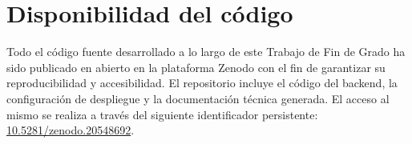\chapter{Disponibilidad del código}
Todo el código fuente desarrollado a lo largo de este Trabajo de Fin de Grado ha sido publicado en abierto en la plataforma Zenodo con el fin de garantizar su reproducibilidad y accesibilidad. El repositorio incluye el código del backend, la configuración de despliegue y la documentación técnica generada. El acceso al mismo se realiza a través del siguiente identificador persistente: \href{https://zenodo.org/records/20548692}{10.5281/zenodo.20548692}.
